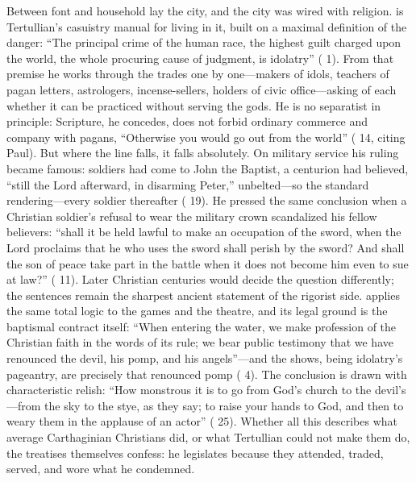 Between font and household lay the city, and the city was wired with religion.
 is Tertullian's casuistry manual for living in it, built on
a maximal definition of the danger: ``The principal crime of the human race,
the highest guilt charged upon the world, the whole procuring cause of
judgment, is idolatry'' ( 1). From that premise he works
through the trades one by one---makers of idols, teachers of pagan letters,
astrologers, incense-sellers, holders of civic office---asking of each whether
it can be practiced without serving the gods. He is no separatist in
principle: Scripture, he concedes, does not forbid ordinary commerce and
company with pagans, ``Otherwise you would go out from the world'' ( 14, citing Paul). But where the line falls, it falls absolutely.
On military service his ruling became famous: soldiers had come to John the
Baptist, a centurion had believed, ``still the Lord afterward, in disarming
Peter,'' unbelted---so the standard rendering---every soldier thereafter
( 19). He pressed the same conclusion when a Christian
soldier's refusal to wear the military crown scandalized his fellow
believers: ``shall it be held lawful to make an occupation of the sword, when
the Lord proclaims that he who uses the sword shall perish by the sword? And
shall the son of peace take part in the battle when it does not become him
even to sue at law?'' ( 11). Later Christian
centuries would decide the question differently; the sentences remain the
sharpest ancient statement of the rigorist side.  applies
the same total logic to the games and the theatre, and its legal ground is
the baptismal contract itself: ``When entering the water, we make profession
of the Christian faith in the words of its rule; we bear public testimony
that we have renounced the devil, his pomp, and his angels''---and the
shows, being idolatry's pageantry, are precisely that renounced pomp
( 4). The conclusion is drawn with characteristic relish:
``How monstrous it is to go from God's church to the devil's---from the sky
to the stye, as they say; to raise your hands to God, and then to weary them
in the applause of an actor'' ( 25). Whether all this describes
what average Carthaginian Christians did, or what Tertullian could not make
them do, the treatises themselves confess: he legislates because they
attended, traded, served, and wore what he condemned.
